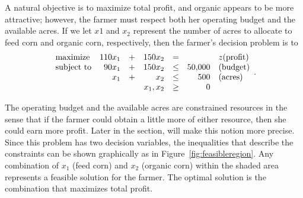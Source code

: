 A natural objective is to maximize total profit, and organic appears to be 
more attractive; however, the farmer must
respect both her operating budget and the available acres. If we let $x1$ and 
$x_2$ represent the 
number of acres to allocate to feed corn and organic corn, respectively,
then the farmer's decision problem is to
\[
\begin{array}{lrrrrrl}
\textrm{maximize}   & 110x_1 & + & 150x_2 & = &  & z \textrm{(profit)} \\
\textrm{subject to} & 90x_1 & + & 150x_2 & \leq & \num{50000} & \textrm{(budget)} \\
                    & x_1 & + & x_2   & \leq & 500  & \textrm{(acres)} \\
\multicolumn{4}{r}{x_1,x_2}& \geq & 0 &
\end{array}.
\]

The operating budget and the available acres are constrained resources in
the sense that if the farmer could obtain a little more of either resource,
then she could earn more profit. Later in the section, will make this 
notion more precise. Since this problem has two decision variables, the 
inequalities that describe the constraints can be shown graphically
as in Figure~\ref{fig:feasibleregion}. Any combination of $x_1$ (feed corn)
and $x_2$ (organic corn) within the shaded area represents a feasible
solution for the farmer. The optimal solution is the combination that 
maximizes total profit.

